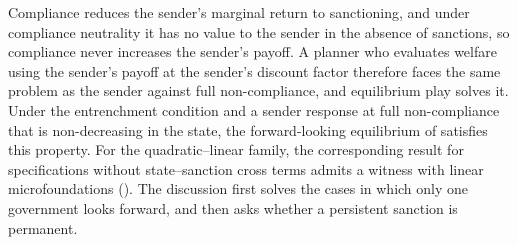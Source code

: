 Compliance reduces the sender's marginal return to sanctioning, and under compliance
neutrality it has no value to the sender in the absence of sanctions, so compliance
never increases the sender's payoff. A planner who evaluates welfare using the sender's
payoff at the sender's discount factor therefore faces the same problem as the sender
against full non-compliance, and equilibrium play solves it. Under the entrenchment
condition and a sender response at full non-compliance that is non-decreasing in the
state, the forward-looking equilibrium of  satisfies this
property. For the quadratic--linear family, the corresponding result for specifications without
state--sanction cross terms admits a witness with linear microfoundations (). The
discussion first solves the cases in which only one government looks forward, and then
asks whether a persistent sanction is permanent.
